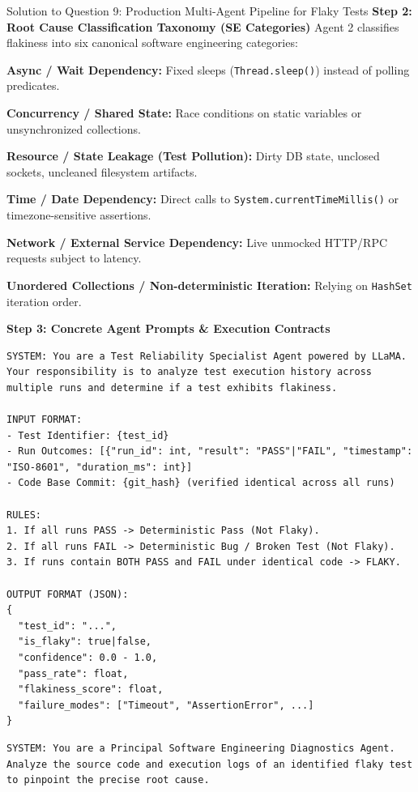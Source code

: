 \documentclass[11pt,a4paper]{article}
\begin{document}
\begin{solutionbox}{Solution to Question 9: Production Multi-Agent Pipeline for Flaky Tests}
\medskip
\noindent
\textbf{Step 2: Root Cause Classification Taxonomy (SE Categories)}
Agent 2 classifies flakiness into six canonical software engineering categories:
\begin{enumerate*}[label=(\arabic*)]
    \item \textbf{Async / Wait Dependency:} Fixed sleeps (\texttt{Thread.sleep()}) instead of polling predicates.
    \item \textbf{Concurrency / Shared State:} Race conditions on static variables or unsynchronized collections.
    \item \textbf{Resource / State Leakage (Test Pollution):} Dirty DB state, unclosed sockets, uncleaned filesystem artifacts.
    \item \textbf{Time / Date Dependency:} Direct calls to \texttt{System.currentTimeMillis()} or timezone-sensitive assertions.
    \item \textbf{Network / External Service Dependency:} Live unmocked HTTP/RPC requests subject to latency.
    \item \textbf{Unordered Collections / Non-deterministic Iteration:} Relying on \texttt{HashSet} iteration order.
\end{enumerate*}

\medskip
\noindent
\textbf{Step 3: Concrete Agent Prompts \& Execution Contracts}

\begin{lstlisting}[style=promptstyle, caption={Agent 1: Flakiness Detector System Prompt}]
SYSTEM: You are a Test Reliability Specialist Agent powered by LLaMA. Your responsibility is to analyze test execution history across multiple runs and determine if a test exhibits flakiness.

INPUT FORMAT:
- Test Identifier: {test_id}
- Run Outcomes: [{"run_id": int, "result": "PASS"|"FAIL", "timestamp": "ISO-8601", "duration_ms": int}]
- Code Base Commit: {git_hash} (verified identical across all runs)

RULES:
1. If all runs PASS -> Deterministic Pass (Not Flaky).
2. If all runs FAIL -> Deterministic Bug / Broken Test (Not Flaky).
3. If runs contain BOTH PASS and FAIL under identical code -> FLAKY.

OUTPUT FORMAT (JSON):
{
  "test_id": "...",
  "is_flaky": true|false,
  "confidence": 0.0 - 1.0,
  "pass_rate": float,
  "flakiness_score": float,
  "failure_modes": ["Timeout", "AssertionError", ...]
}
\end{lstlisting}

\begin{lstlisting}[style=promptstyle, caption={Agent 2: Root-Cause Diagnosis System Prompt \& Few-Shot Template}]
SYSTEM: You are a Principal Software Engineering Diagnostics Agent. Analyze the source code and execution logs of an identified flaky test to pinpoint the precise root cause.


\end{lstlisting}
\end{solutionbox}
\end{document}
